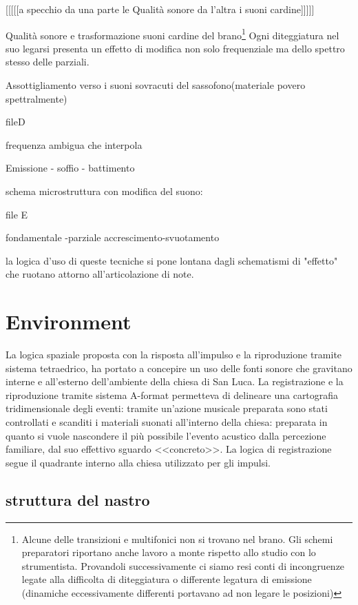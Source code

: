[[[[[a specchio da una parte le Qualità sonore da l'altra i suoni cardine]]]]]

Qualità sonore e trasformazione suoni cardine del brano\footnote{Alcune delle transizioni
e multifonici non si trovano nel brano. Gli schemi preparatori riportano anche lavoro a
monte rispetto allo studio con lo strumentista.  Provandoli successivamente ci siamo
resi conti di incongruenze legate alla difficolta di diteggiatura o differente
legatura di emissione (dinamiche eccessivamente differenti portavano ad non legare le posizioni)}
Ogni diteggiatura nel suo legarsi presenta un effetto di modifica non solo
frequenziale ma dello spettro stesso delle parziali.

Assottigliamento verso i suoni sovracuti del sassofono(materiale povero spettralmente)

fileD

frequenza ambigua che interpola

Emissione - soffio - battimento


schema microstruttura con modifica del suono:

file E

fondamentale -parziale accrescimento-svuotamento

la logica d'uso di queste tecniche si pone lontana dagli schematismi di "effetto" che ruotano attorno all'articolazione di note.

\section{Environment}

La logica spaziale proposta con la risposta all'impulso e la riproduzione tramite sistema tetraedrico, ha portato a concepire un uso delle fonti sonore che gravitano interne e all’esterno dell'ambiente della chiesa di San Luca.
 La registrazione e la riproduzione tramite sistema A-format permetteva di delineare una cartografia tridimensionale degli eventi: tramite un'azione musicale preparata sono stati controllati e scanditi i materiali suonati all'interno della chiesa: preparata in quanto si vuole nascondere il più possibile l’evento acustico dalla percezione familiare, dal suo effettivo sguardo <<concreto>>.
La logica di registrazione segue il quadrante interno alla chiesa utilizzato per gli impulsi.

\subsection{struttura del nastro}

